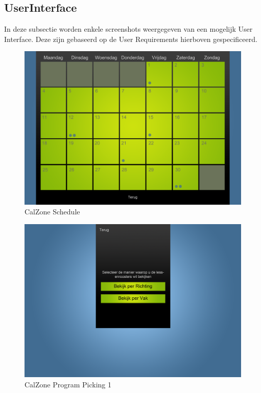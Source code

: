 \subsection{UserInterface}

In deze subsectie worden enkele screenshots weergegeven van een mogelijk User Interface. Deze zijn gebaseerd op de User Requirements hierboven gespecificeerd.

\begin{center}

\begin{figure}[H]
\caption{CalZone Schedule}
\centerline{\includegraphics[scale=0.4]{img/CalzoneSchedule}}
\label{fig:CalZone Schedule}
\end{figure}

\begin{figure}[H]
\caption{CalZone Program Picking 1}
\centerline{\includegraphics[scale=0.4]{img/Calzoneprogrammepicking}}
\label{fig:CalZone Program Picking}
\end{figure}


\end{center}
